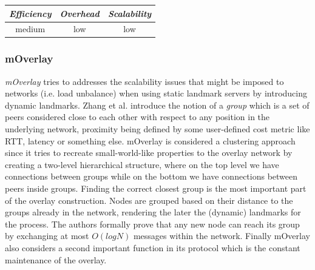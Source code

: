 \begin{center}
\begin{tabular}{ccc}
\emph{Efficiency} & \emph{Overhead} & \emph{Scalability} \\
\hline
medium &
low &
low
\end{tabular}
\end{center}

\subsubsection{mOverlay}
\emph{mOverlay} \cite{ZZZSZ2004} tries to addresses the scalability
issues that might be imposed to networks (i.e. load unbalance) when using static
landmark servers by introducing dynamic landmarks. Zhang et al. introduce the
notion of a \emph{group} which is a set of peers considered close to each other
with respect to any position in the underlying network, proximity being defined
by some user-defined cost metric like RTT, latency or something else. mOverlay
is considered a clustering approach since it tries to recreate small-world-like
properties to the overlay network by creating a two-level hierarchical
structure, where on the top level we have connections between groups while on
the bottom we have connections between peers inside groups. Finding the correct
closest group is the most important part of the overlay construction. Nodes are
grouped based on their distance to the groups already in the network, rendering
the later the (dynamic) landmarks for the process. The authors formally prove
that any new node can reach its group by exchanging at most $O(logN)$ messages
within the network. Finally mOverlay also considers a second important function
in its protocol which is the constant maintenance of the overlay.

